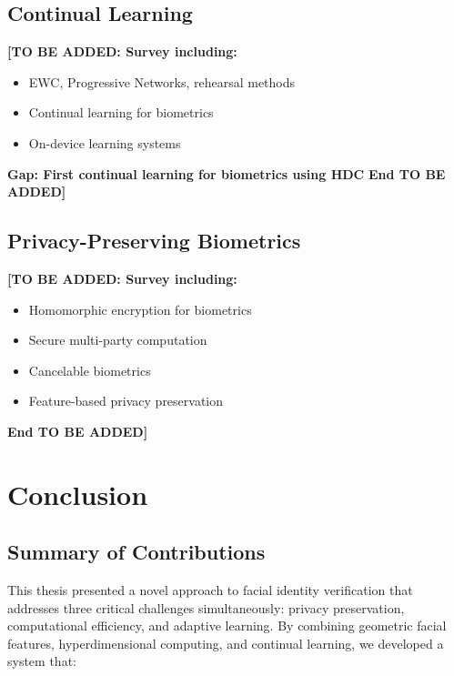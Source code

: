 \documentclass[a4paper,12pt]{article}
\begin{document}
\subsection{Continual Learning}

\textbf{[TO BE ADDED: Survey including:}
\begin{itemize}
    \item EWC, Progressive Networks, rehearsal methods
    \item Continual learning for biometrics
    \item On-device learning systems
\end{itemize}
\textbf{Gap: First continual learning for biometrics using HDC}
\textbf{End TO BE ADDED]}

\subsection{Privacy-Preserving Biometrics}

\textbf{[TO BE ADDED: Survey including:}
\begin{itemize}
    \item Homomorphic encryption for biometrics
    \item Secure multi-party computation
    \item Cancelable biometrics
    \item Feature-based privacy preservation
\end{itemize}
\textbf{End TO BE ADDED]}

\newpage

\section{Conclusion}

\subsection{Summary of Contributions}

This thesis presented a novel approach to facial identity verification that addresses three critical challenges simultaneously: privacy preservation, computational efficiency, and adaptive learning. By combining geometric facial features, hyperdimensional computing, and continual learning, we developed a system that:
\end{document}
